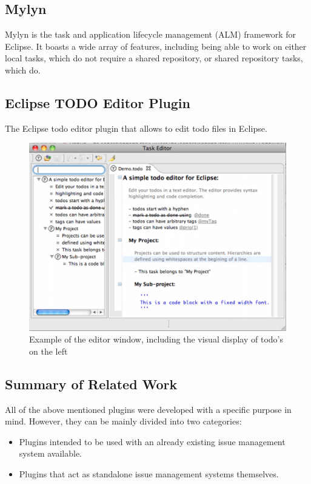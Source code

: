 \documentclass{4thYearProject}
\begin{document}
\subsection{Mylyn}

Mylyn is the task and application lifecycle management (ALM) framework for Eclipse. It boasts a wide array of features, including being able to work on either local tasks, which do not require a shared repository, or shared repository tasks, which do. 

\subsection{Eclipse TODO Editor Plugin}

The Eclipse todo editor plugin that allows to edit todo files in Eclipse. 

\begin{figure}[H]
\includegraphics[scale=0.6]{eclipse_TODO_editor}
\centering
\caption{Example of the editor window, including the visual display of todo's on the left}\label{eclipsetodo}
\label{fig:eclipsetodo}
\end{figure}

\subsection{Summary of Related Work}

All of the above mentioned plugins were developed with a specific purpose in mind. However, they can be mainly divided into two categories:

\begin{itemize}
\item Plugins intended to be used with an already existing issue management system available. 
\item Plugins that act as standalone issue management systems themselves.
\end{itemize}
\end{document}

